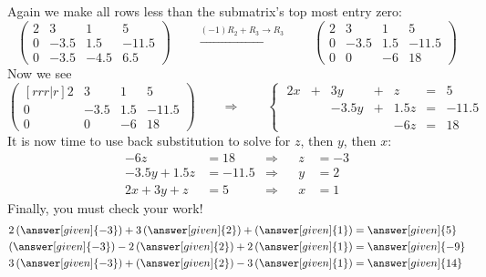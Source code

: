 \documentclass{ximera}
\begin{document}
\begin{example}
\begin{explanation}
\begin{center}
\end{center}
Again we make all rows less than the submatrix's top most entry zero:
\[
  \begin{pmatrix}
    2 & 3 & 1 & 5 \\
    0 & -3.5 & 1.5 &-11.5 \\
    0 & -3.5 & -4.5 & 6.5
  \end{pmatrix}
  \qquad\xrightarrow{(-1) R_2+R_3\to R_3}\qquad
  \begin{pmatrix}
    2 & 3 & 1 & 5 \\
    0 & -3.5 & 1.5 &-11.5 \\
    0 & 0    & -6 & 18
  \end{pmatrix}
\]
Now we see
\[
  \begin{pmatrix}[rrr|r]
    2 & 3 & 1 & 5 \\
    0 & -3.5 & 1.5 &-11.5 \\
    0 & 0    & -6 & 18
  \end{pmatrix}
  \qquad\Longrightarrow\qquad
  \left\{\;
    \begin{array}{rcrcrcr}
      2x  &+ & 3y &+& z &=& 5 \\
          &  &-3.5y&+&1.5z&=&-11.5\\
          & & & &-6z&=&18
    \end{array}
  \right.
\]
It is now time to use back substitution to solve for $z$, then $y$, then $x$:
\begin{align*}
  -6z &= 18   &\Rightarrow & & z &= -3\\
  -3.5y+1.5z &=-11.5 &\Rightarrow & & y &= 2\\
  2x  +  3y + z &= 5 &\Rightarrow & & x &= 1
\end{align*}
Finally, you must check your work!
  \begin{align*}
    2\left(\answer[given]{-3}\right)+ 3\left(\answer[given]{2}\right) + \left(\answer[given]{1}\right)  &= \answer[given]{5} \\
    \left(\answer[given]{-3}\right) -2\left(\answer[given]{2}\right)+ 2\left(\answer[given]{1}\right) &=\answer[given]{-9}\\
    3\left(\answer[given]{-3}\right) +\left(\answer[given]{2}\right)- 3\left(\answer[given]{1}\right) &=\answer[given]{14}
  \end{align*}


\end{explanation}
\end{example}
\end{document}
